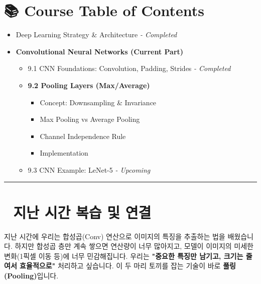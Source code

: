 \documentclass[11pt,a4paper]{book}
\theoremstyle{definition}
\begin{document}
\section*{📚 Course Table of Contents}
\begin{itemize}
    \item[Chapter 1-8.] Deep Learning Strategy \& Architecture \textit{- Completed}
    \item[\textbf{Chapter 9.}] \textbf{Convolutional Neural Networks (Current Part)}
    \begin{itemize}
        \item 9.1 CNN Foundations: Convolution, Padding, Strides \textit{- Completed}
        \item \textbf{9.2 Pooling Layers (Max/Average)}
        \begin{itemize}
            \item Concept: Downsampling \& Invariance
            \item Max Pooling vs Average Pooling
            \item Channel Independence Rule
            \item Implementation
        \end{itemize}
        \item 9.3 CNN Example: LeNet-5 \textit{- Upcoming}
    \end{itemize}
\end{itemize}

\vspace{0.5cm}
\hrule
\vspace{0.5cm}

\section*{🔗 지난 시간 복습 및 연결}
지난 시간에 우리는 합성곱(Conv) 연산으로 이미지의 특징을 추출하는 법을 배웠습니다. 하지만 합성곱 층만 계속 쌓으면 연산량이 너무 많아지고, 모델이 이미지의 미세한 변화(1픽셀 이동 등)에 너무 민감해집니다.
우리는 \textbf{"중요한 특징만 남기고, 크기는 줄여서 효율적으로"} 처리하고 싶습니다. 이 두 마리 토끼를 잡는 기술이 바로 \textbf{풀링(Pooling)}입니다.

\end{document}
